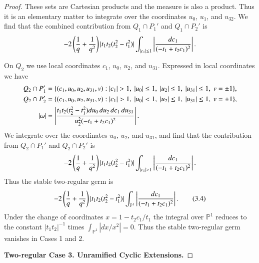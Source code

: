 \documentclass{amsart}
\newcommand\bP{{\mathbb P}}
\begin{document}
\begin{proof}
These sets are Cartesian products and the measure is also
a product.  Thus it is an elementary matter to integrate
over the coordinates $u_0$, $u_1$, and $u_{32}$.  We find
that the combined
contribution from $Q_1\cap P_1'$ and $Q_1\cap P_2'$
is
$$
-2\left({1\over q}+ {1\over q^2}\right)
|t_1 t_2 (t^2_2-t_1^2) | \int_{|c_1|\le 1}
\left| {dc_1\over (-t_1+ t_2 c_1)^2} \right|.
$$

On $Q_2$ we use local coordinates $c_1$, $u_0$, $u_2$, and $u_{31}$.
Expressed in local coordinates we have
\begin{align*}
Q_2\cap P_1' &=\{(c_1,u_0,u_2,u_{31},v) :
 |c_1|>1,\ |u_0|\le 1,\ |u_2|\le 1,\ |u_{31}|\le 1,\ v=\pm1\},
 \\
Q_2\cap P_2' &=\{(c_1,u_0,u_2,u_{31},v) :
 |c_1|>1,\ |u_0|<1,\ |u_2|\le 1,\ |u_{31}|\le 1,\ v=\pm1\},
\vadjust{\vskip0.5\baselineskip}
 \\
|\omega| &=
\left| {t_1 t_2 (t_2^2-t_1^2) du_0\, du_2\, dc_1\, du_{31} \over
u_2^2 (-t_1+ t_2 c_1)^2}
\right|.
\end{align*}
We integrate over the coordinates $u_0$, $u_2$, and $u_{31}$,
and find that the contribution from $Q_2\cap P_1'$ and 
$Q_2\cap P_2'$ is
$$
-2\left( {1\over q} + {1\over q^2}\right)
|t_1 t_2 (t_2^2-t_1^2)|
\int_{|c_1|>1}
\left| {dc_1 \over (-t_1+t_2 c_1)^2 } \right|.
$$
Thus the stable two-regular germ is 
\begin{equation}
-2\left({1\over q}+{1\over q^2}\right)
|t_1 t_2 (t_2^2-t_1^2)|
\int_{\bP^1} \left|{dc_1 \over (-t_1+t_2 c_1)^2 }\right|.
\tag{3.4}
\end{equation}
Under the change of coordinates $x = 1- t_2 c_1/t_1$ the integral
over $\bP^1$
reduces to the constant $|t_1t_2|^{-1}$
times $\int_{\bP^1} |dx/x^2| = 0$.
Thus the stable two-regular germ vanishes in Cases 1 and 2.

\bigskip
\centerline{\bf Two-regular Case 3. Unramified Cyclic Extensions.}
\bigskip


\end{proof}
\end{document}
